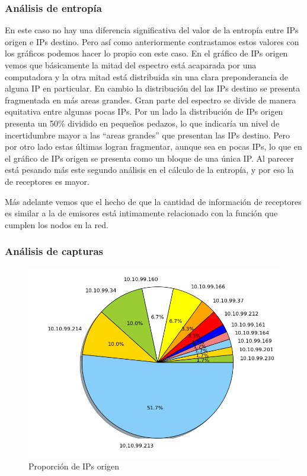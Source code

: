 \subsubsection{Análisis de entropía}
En este caso no hay una diferencia significativa del valor de la entropía entre IPs origen e IPs destino. Pero así como anteriormente contrastamos estos valores con los gráficos podemos hacer lo propio con este caso. En el gráfico de IPs origen vemos que básicamente la mitad del espectro está acaparada por una computadora y la otra mitad está distribuida sin una clara preponderancia de alguna IP en particular. En cambio la distribución del las IPs destino se presenta fragmentada en más areas grandes. Gran parte del espectro se divide de manera equitativa entre algunas pocas IPs. 
Por un lado la distribución de IPs origen presenta un 50\% dividido en pequeños pedazos, lo que indicaría un nivel de incertidumbre mayor a las ``areas grandes'' que presentan las IPs destino. Pero por otro lado estas últimas logran fragmentar, aunque sea en pocas IPs, lo que en el gráfico de IPs origen se presenta como un bloque de una única IP.
Al parecer está pesando más este segundo análisis en el cálculo de la entropía, y por eso la de receptores es mayor.

Más adelante vemos que el hecho de que la cantidad de información de receptores es similar a la de emisores está intimamente relacionado con la función que cumplen los nodos en la red.

\subsubsection{Análisis de capturas}
\begin{figure}[!h]
  \includegraphics[width=\textwidth,keepaspectratio]{graph/emisores_somodi.png}
  \caption{Proporción de IPs origen}
  \label{fig:torta-emisor-inv}
\end{figure}

